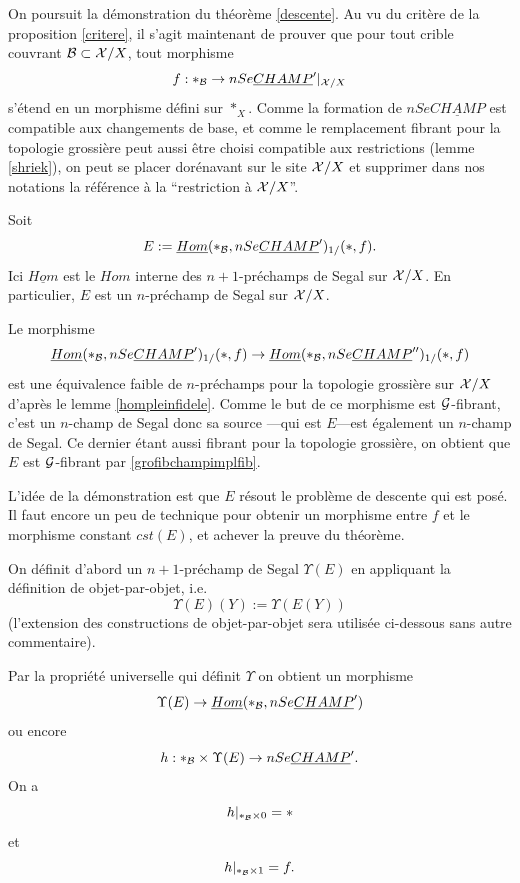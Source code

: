 \documentclass[12pt]{article}
\newcommand{\Gg}{{\cal G}}
\newcommand{\Bb}{{\cal B}}
\newcommand{\Xx}{{\cal X}}
\begin{document}
On poursuit la d\'emonstration du th\'eor\`eme \ref{descente}.
Au vu du crit\`ere de la proposition \ref{critere},
il s'agit maintenant de prouver que pour tout crible
couvrant $\Bb \subset \Xx /X$, tout
morphisme
$$
f:\ast _{\Bb} \rightarrow nSe\underline{CHAMP}'|_{\Xx /X}
$$
s'\'etend en un morphisme d\'efini sur $\ast _X$. Comme la formation de
$nSe\underline{CHAMP}$ est compatible aux changements de base, et comme
le remplacement fibrant pour la topologie grossi\`ere peut aussi \^etre
choisi compatible aux restrictions (lemme \ref{shriek}), on peut se placer
dor\'enavant sur le site $\Xx /X$ et supprimer dans nos notations la
r\'ef\'erence \`a la ``restriction \`a $\Xx
/X$''.

Soit $$
E:= \underline{Hom}(\ast _{\Bb},nSe\underline{CHAMP}')_{1/}(\ast , f).
$$
Ici $\underline{Hom}$ est le $Hom$ interne des $n+1$-pr\'echamps de Segal sur
$\Xx /X$. En particulier,  $E$ est un $n$-pr\'echamp de Segal sur $\Xx /X$.

Le morphisme
$$
\underline{Hom}(\ast _{\Bb},nSe\underline{CHAMP}')_{1/}(\ast , f)
\rightarrow
\underline{Hom}(\ast _{\Bb},nSe\underline{CHAMP}'')_{1/}(\ast , f)
$$
est une \'equivalence faible de $n$-pr\'echamps
pour la topologie grossi\`ere sur
$\Xx /X$ d'apr\`es le lemme \ref{hompleinfidele}. Comme le but de ce
morphisme est
$\Gg$-fibrant, c'est un $n$-champ de Segal donc
sa source
---qui est $E$---est
\'egalement un $n$-champ de Segal. Ce dernier \'etant aussi fibrant pour la
topologie grossi\`ere, on obtient que $E$ est $\Gg$-fibrant par
\ref{grofibchampimplfib}.

L'id\'ee de la d\'emonstration est que $E$ r\'esout le probl\`eme de
descente qui est pos\'e. Il faut
encore un peu de technique pour obtenir un morphisme
entre $f$ et le morphisme constant $cst(E)$, et
achever la preuve du th\'eor\`eme.

On d\'efinit d'abord un $n+1$-pr\'echamp de Segal $\Upsilon (E)$ en
appliquant la
d\'efinition de \cite{limits} objet-par-objet, i.e.
$$
\Upsilon (E)(Y):= \Upsilon (E(Y))
$$
(l'extension des constructions de \cite{limits} objet-par-objet sera utilis\'ee
ci-dessous sans autre commentaire).

Par la propri\'et\'e
universelle qui d\'efinit $\Upsilon$ on obtient un morphisme $$
\Upsilon (E)\rightarrow \underline{Hom}(\ast _{\Bb},nSe\underline{CHAMP}')
$$
ou encore
$$
h: \ast _{\Bb} \times \Upsilon (E) \rightarrow nSe\underline{CHAMP}'.
$$
On a
$$
h|_{\ast _{\Bb} \times 0} = \ast
$$
et
$$
h|_{\ast _{\Bb} \times 1} = f.
$$
\end{document}
